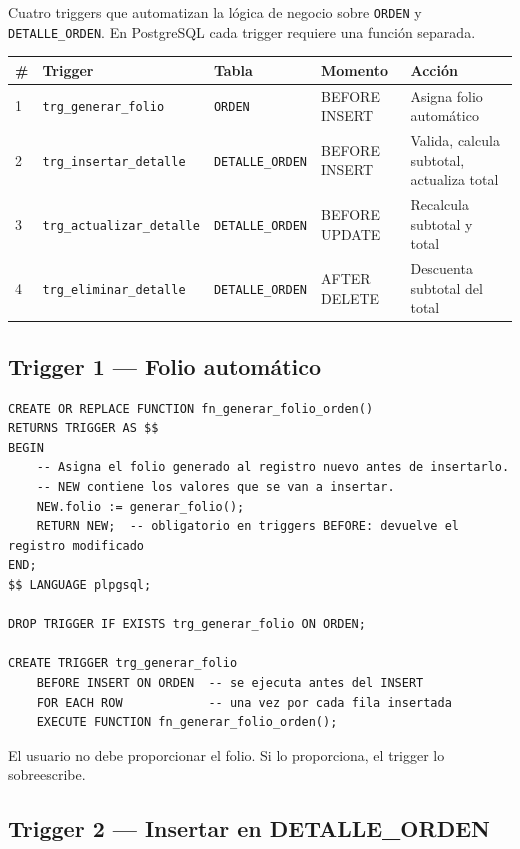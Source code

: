 \documentclass[12pt, a4paper]{article}
\begin{document}
Cuatro triggers que automatizan la l\'ogica de negocio sobre \texttt{ORDEN} y \texttt{DETALLE\_ORDEN}. En PostgreSQL cada trigger requiere una funci\'on separada.

\begin{center}
\begin{tabularx}{\textwidth}{llllX}
    \toprule
    \textbf{\#} & \textbf{Trigger} & \textbf{Tabla} & \textbf{Momento} & \textbf{Acci\'on} \\
    \midrule
    1 & \texttt{trg\_generar\_folio}     & \texttt{ORDEN}        & BEFORE INSERT & Asigna folio autom\'atico \\
    2 & \texttt{trg\_insertar\_detalle}  & \texttt{DETALLE\_ORDEN} & BEFORE INSERT & Valida, calcula subtotal, actualiza total \\
    3 & \texttt{trg\_actualizar\_detalle}& \texttt{DETALLE\_ORDEN} & BEFORE UPDATE & Recalcula subtotal y total \\
    4 & \texttt{trg\_eliminar\_detalle}  & \texttt{DETALLE\_ORDEN} & AFTER DELETE  & Descuenta subtotal del total \\
    \bottomrule
\end{tabularx}
\end{center}

\subsection{Trigger 1 --- Folio autom\'atico}

\begin{lstlisting}[caption={Funci\'on y trigger de folio autom\'atico}]
CREATE OR REPLACE FUNCTION fn_generar_folio_orden()
RETURNS TRIGGER AS $$
BEGIN
    -- Asigna el folio generado al registro nuevo antes de insertarlo.
    -- NEW contiene los valores que se van a insertar.
    NEW.folio := generar_folio();
    RETURN NEW;  -- obligatorio en triggers BEFORE: devuelve el registro modificado
END;
$$ LANGUAGE plpgsql;

DROP TRIGGER IF EXISTS trg_generar_folio ON ORDEN;

CREATE TRIGGER trg_generar_folio
    BEFORE INSERT ON ORDEN  -- se ejecuta antes del INSERT
    FOR EACH ROW            -- una vez por cada fila insertada
    EXECUTE FUNCTION fn_generar_folio_orden();
\end{lstlisting}

El usuario no debe proporcionar el folio. Si lo proporciona, el trigger lo sobreescribe.

\subsection{Trigger 2 --- Insertar en DETALLE\_ORDEN}
\end{document}
